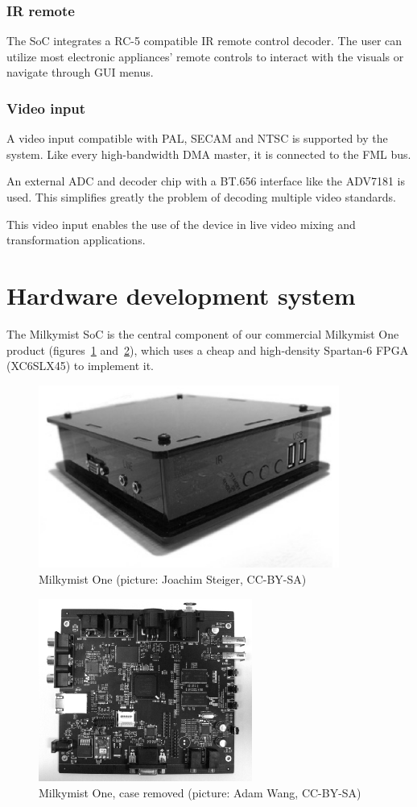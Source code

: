 \documentclass[a4paper,11pt,twocolumn]{paper}
\begin{document}
\subsubsection{IR remote}
The SoC integrates a RC-5 compatible IR remote control decoder. The user can utilize most electronic appliances' remote controls to interact with the visuals or navigate through GUI menus.

\subsubsection{Video input}
A video input compatible with PAL, SECAM and NTSC is supported by the system. Like every high-bandwidth DMA master, it is connected to the FML bus.

An external ADC and decoder chip with a BT.656 interface like the ADV7181 is used. This simplifies greatly the problem of decoding multiple video standards.

This video input enables the use of the device in live video mixing and transformation applications.

\section{Hardware development system}
The Milkymist SoC is the central component of our commercial Milkymist One product (figures~\ref{fig:mm1} and~\ref{fig:mm1nocase}), which uses a cheap and high-density Spartan-6 FPGA (XC6SLX45) to implement it.

\begin{figure}
\centering
\includegraphics[height=60mm]{mm1_bw.eps}
\caption{Milkymist One (picture: Joachim Steiger, CC-BY-SA)}
\label{fig:mm1}
\end{figure}

\begin{figure}
\centering
\includegraphics[height=60mm]{mm1nocase_bw.eps}
\caption{Milkymist One, case removed (picture: Adam Wang, CC-BY-SA)}
\label{fig:mm1nocase}
\end{figure}
\end{document}
